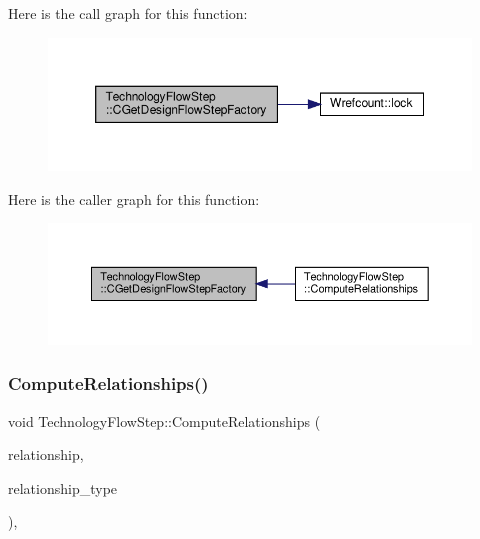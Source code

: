 Here is the call graph for this function\+:
\nopagebreak
\begin{figure}[H]
\begin{center}
\leavevmode
\includegraphics[width=350pt]{d9/deb/classTechnologyFlowStep_a10c1c680300843016dfcd692831845d0_cgraph}
\end{center}
\end{figure}
Here is the caller graph for this function\+:
\nopagebreak
\begin{figure}[H]
\begin{center}
\leavevmode
\includegraphics[width=350pt]{d9/deb/classTechnologyFlowStep_a10c1c680300843016dfcd692831845d0_icgraph}
\end{center}
\end{figure}
\mbox{\label{classTechnologyFlowStep_a94c17619fd6b02de821d7e41ff454d85}} 
\subsubsection{\texorpdfstring{Compute\+Relationships()}{ComputeRelationships()}}
{\footnotesize\ttfamily void Technology\+Flow\+Step\+::\+Compute\+Relationships (\begin{DoxyParamCaption}\item[{\hyperlink{classDesignFlowStepSet}{Design\+Flow\+Step\+Set} \&}]{relationship,  }\item[{const \hyperlink{classDesignFlowStep_a723a3baf19ff2ceb77bc13e099d0b1b7}{Design\+Flow\+Step\+::\+Relationship\+Type}}]{relationship\+\_\+type }\end{DoxyParamCaption})\hspace{0.3cm}{\ttfamily [override]}, {\ttfamily [virtual]}}



